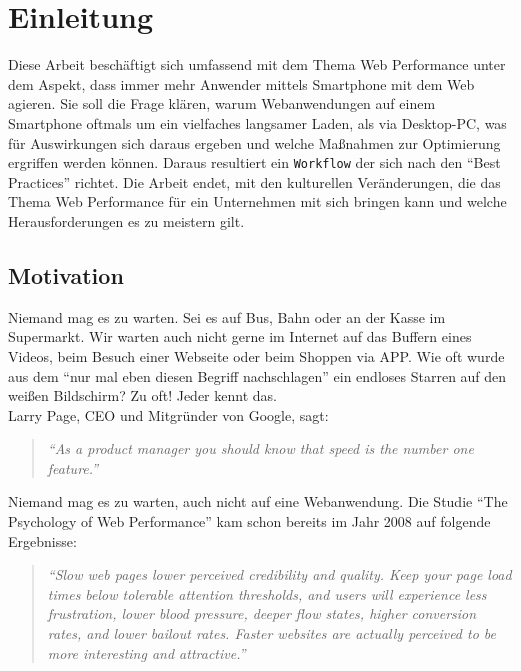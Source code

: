 \setcounter{page}{1}

\section{Einleitung} %
\label{sec:einleitung}
	Diese Arbeit beschäftigt sich umfassend mit dem Thema Web Performance unter dem Aspekt, dass immer mehr Anwender mittels Smartphone mit dem Web agieren. Sie soll die Frage klären, warum Webanwendungen auf einem Smartphone oftmals um ein vielfaches langsamer Laden, als via Desktop-PC, was für Auswirkungen sich daraus ergeben und welche Maßnahmen zur Optimierung ergriffen werden können. Daraus resultiert ein \texttt{Workflow} der sich nach den "`Best Practices"' richtet. Die Arbeit endet, mit den kulturellen Veränderungen, die das Thema Web Performance für ein Unternehmen mit sich bringen kann und welche Herausforderungen es zu meistern gilt.

	\subsection{Motivation} %
	\label{sub:motivation}

		Niemand mag es zu warten. Sei es auf Bus, Bahn oder an der Kasse im Supermarkt. Wir warten auch nicht gerne im Internet auf das Buffern eines Videos, beim Besuch einer Webseite oder beim Shoppen via APP. Wie oft wurde aus dem "`nur mal eben diesen Begriff nachschlagen"' ein endloses Starren auf den weißen Bildschirm? Zu oft! Jeder kennt das.\\

		Larry Page, CEO und Mitgründer von Google, sagt:
		\begin{quote}
			\textit{"`As a product manager you should know that speed is the number one feature."'}\autocite{holzle10}
		\end{quote}
		Niemand mag es zu warten, auch nicht auf eine Webanwendung. Die Studie "`The Psychology of Web Performance"' kam schon bereits im Jahr 2008 auf folgende Ergebnisse:

		\begin{quote}\itshape
			"`Slow web pages lower perceived credibility and quality. Keep your page load times below tolerable attention thresholds, and users will experience less frustration, lower blood pressure, deeper flow states, higher conversion rates, and lower bailout rates. Faster websites are actually perceived to be more interesting and attractive."' \autocite{webOpti08}
		\end{quote}

